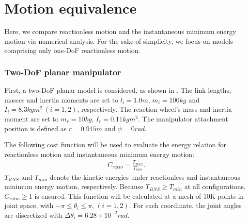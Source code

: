 \section{Motion equivalence}
Here, we compare reactionless motion and the instantaneous minimum energy motion via numerical analysis.
For the sake of simplicity, we  focus on models comprising only one-DoF reactionless motion.

\subsubsection{Two-DoF planar manipulator}
%
First, a two-DoF planar model is considered, as shown in .
The link lengths, masses and inertia moments are set to $l_{i} = 1.0\unit{m}$,
$m_{i} = 100\unit{kg}$ and $I_{i} = 8.3\unit{kgm^{2}}~(i=1,2)$, respectively.
The reaction wheel's mass and inertia moment are set to $m_{r} = 10\unit{kg}$,
$I_{r} = 0.11\unit{kgm^{2}}$.
The manipulator attachment position is defined as $r = 0.945\unit{m}$ and $\psi = 0\unit{rad}$.

The following cost function will be used to evaluate the energy relation for 
reactionless motion and instantaneous minimum energy motion:
%
\begin{align}
  C_{ratio} = \frac{T_{RNS}}{T_{min}}.
\end{align}
%
 $T_{RNS}$ and $T_{min}$ denote the  kinetic energies under
reactionless  and  instantaneous minimum energy motion, respectively.
Because $T_{RNS} \geq T_{min}$ at all configurations, $C_{ratio} \geq 1$ is ensured.
This function will be calculated at a mesh of 10K points in joint space, 
with $-\pi \leq \theta_{i} \leq \pi$, $(i = 1,2)$.
For each coordinate, the joint angles are discretized with $\Delta \theta_{i} = 6.28\times 10^{-2}\unit{rad}$.

